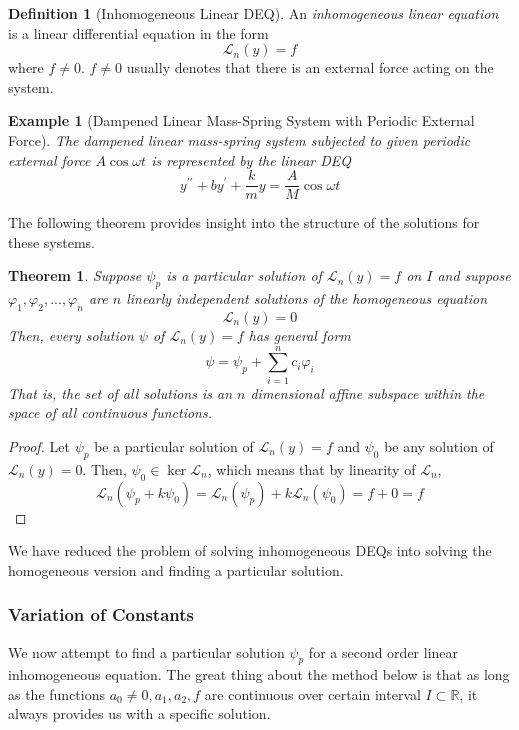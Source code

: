 \documentclass{article}
\newtheorem{theorem}{Theorem}[section]
\newtheorem{example}{Example}[section]
\theoremstyle{remark}
\theoremstyle{definition}
\newtheorem{definition}{Definition}[section]
\begin{document}
    \begin{definition}[Inhomogeneous Linear DEQ]
    An \textit{inhomogeneous linear equation} is a linear differential equation in the form
    \[\mathcal{L}_n (y) = f\]
    where $f \neq 0$. $f \neq 0$ usually denotes that there is an external force acting on the system. 
    \end{definition}

    \begin{example}[Dampened Linear Mass-Spring System with Periodic External Force]
    The dampened linear mass-spring system subjected to given periodic external force $A \cos{\omega t}$ is represented by the linear DEQ
    \[y^{\prime \prime} + by^\prime + \frac{k}{m} y = \frac{A}{M} \cos{\omega t}\]
    \end{example}

    The following theorem provides insight into the structure of the solutions for these systems. 
    \begin{theorem}
    Suppose $\psi_p$ is a particular solution of $\mathcal{L}_n (y) = f$ on $I$ and suppose $\varphi_1, \varphi_2, ..., \varphi_n$ are $n$ linearly independent solutions of the homogeneous equation 
    \[\mathcal{L}_n (y) = 0\]
    Then, every solution $\psi$ of $\mathcal{L}_n (y) = f$ has general form
    \[\psi = \psi_p + \sum_{i=1}^n c_i \varphi_i\]
    That is, the set of all solutions is an $n$ dimensional affine subspace within the space of all continuous functions. 
    \end{theorem}
    \begin{proof}
    Let $\psi_p$ be a particular solution of $\mathcal{L}_n (y) = f$ and $\psi_0$ be any solution of $\mathcal{L}_n (y) = 0$. Then, $\psi_0 \in \ker{\mathcal{L}_n}$, which means that by linearity of $\mathcal{L}_n$, 
    \[\mathcal{L}_n (\psi_p + k \psi_0) = \mathcal{L}_n (\psi_p) + k \mathcal{L}_n (\psi_0) = f + 0 = f\]
    \end{proof}

    We have reduced the problem of solving inhomogeneous DEQs into solving the homogeneous version and finding a particular solution. 

    \subsubsection{Variation of Constants}

      We now attempt to find a particular solution $\psi_p$ for a second order linear inhomogeneous equation. The great thing about the method below is that as long as the functions $a_0 \neq 0, a_1, a_2, f$ are continuous over certain interval $I \subset \mathbb{R}$, it always provides us with a specific solution. 
\end{document}
